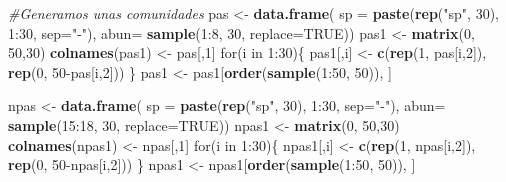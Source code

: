 \documentclass[]{book}
\newenvironment{Shaded}{\begin{snugshade}}{\end{snugshade}}
\newcommand{\KeywordTok}[1]{\textcolor[rgb]{0.13,0.29,0.53}{\textbf{{#1}}}}
\newcommand{\DataTypeTok}[1]{\textcolor[rgb]{0.13,0.29,0.53}{{#1}}}
\newcommand{\DecValTok}[1]{\textcolor[rgb]{0.00,0.00,0.81}{{#1}}}
\newcommand{\StringTok}[1]{\textcolor[rgb]{0.31,0.60,0.02}{{#1}}}
\newcommand{\CommentTok}[1]{\textcolor[rgb]{0.56,0.35,0.01}{\textit{{#1}}}}
\newcommand{\OtherTok}[1]{\textcolor[rgb]{0.56,0.35,0.01}{{#1}}}
\newcommand{\NormalTok}[1]{{#1}}
\begin{document}
\begin{Shaded}
\begin{Highlighting}[]
\CommentTok{#Generamos unas comunidades}
\NormalTok{pas <-}\StringTok{ }\KeywordTok{data.frame}\NormalTok{( }\DataTypeTok{sp =} \KeywordTok{paste}\NormalTok{(}\KeywordTok{rep}\NormalTok{(}\StringTok{"sp"}\NormalTok{, }\DecValTok{30}\NormalTok{), }\DecValTok{1}\NormalTok{:}\DecValTok{30}\NormalTok{, }\DataTypeTok{sep=}\StringTok{"-"}\NormalTok{), }
                   \DataTypeTok{abun=} \KeywordTok{sample}\NormalTok{(}\DecValTok{1}\NormalTok{:}\DecValTok{8}\NormalTok{, }\DecValTok{30}\NormalTok{, }\DataTypeTok{replace=}\OtherTok{TRUE}\NormalTok{))}
\NormalTok{pas1 <-}\StringTok{ }\KeywordTok{matrix}\NormalTok{(}\DecValTok{0}\NormalTok{, }\DecValTok{50}\NormalTok{,}\DecValTok{30}\NormalTok{)}
\KeywordTok{colnames}\NormalTok{(pas1) <-}\StringTok{ }\NormalTok{pas[,}\DecValTok{1}\NormalTok{]}
\NormalTok{for(i in }\DecValTok{1}\NormalTok{:}\DecValTok{30}\NormalTok{)\{}
\NormalTok{pas1[,i] <-}\StringTok{ }\KeywordTok{c}\NormalTok{(}\KeywordTok{rep}\NormalTok{(}\DecValTok{1}\NormalTok{, pas[i,}\DecValTok{2}\NormalTok{]), }\KeywordTok{rep}\NormalTok{(}\DecValTok{0}\NormalTok{, }\DecValTok{50}\NormalTok{-pas[i,}\DecValTok{2}\NormalTok{]))}
\NormalTok{\}}
\NormalTok{pas1 <-}\StringTok{ }\NormalTok{pas1[}\KeywordTok{order}\NormalTok{(}\KeywordTok{sample}\NormalTok{(}\DecValTok{1}\NormalTok{:}\DecValTok{50}\NormalTok{, }\DecValTok{50}\NormalTok{)), ]}

\NormalTok{npas <-}\StringTok{ }\KeywordTok{data.frame}\NormalTok{( }\DataTypeTok{sp =} \KeywordTok{paste}\NormalTok{(}\KeywordTok{rep}\NormalTok{(}\StringTok{"sp"}\NormalTok{, }\DecValTok{30}\NormalTok{), }\DecValTok{1}\NormalTok{:}\DecValTok{30}\NormalTok{, }\DataTypeTok{sep=}\StringTok{"-"}\NormalTok{), }
                    \DataTypeTok{abun=} \KeywordTok{sample}\NormalTok{(}\DecValTok{15}\NormalTok{:}\DecValTok{18}\NormalTok{, }\DecValTok{30}\NormalTok{, }\DataTypeTok{replace=}\OtherTok{TRUE}\NormalTok{))}
\NormalTok{npas1 <-}\StringTok{ }\KeywordTok{matrix}\NormalTok{(}\DecValTok{0}\NormalTok{, }\DecValTok{50}\NormalTok{,}\DecValTok{30}\NormalTok{)}
\KeywordTok{colnames}\NormalTok{(npas1) <-}\StringTok{ }\NormalTok{npas[,}\DecValTok{1}\NormalTok{]}
\NormalTok{for(i in }\DecValTok{1}\NormalTok{:}\DecValTok{30}\NormalTok{)\{}
\NormalTok{npas1[,i] <-}\StringTok{ }\KeywordTok{c}\NormalTok{(}\KeywordTok{rep}\NormalTok{(}\DecValTok{1}\NormalTok{, npas[i,}\DecValTok{2}\NormalTok{]), }\KeywordTok{rep}\NormalTok{(}\DecValTok{0}\NormalTok{, }\DecValTok{50}\NormalTok{-npas[i,}\DecValTok{2}\NormalTok{]))}
\NormalTok{\}}
\NormalTok{npas1 <-}\StringTok{ }\NormalTok{npas1[}\KeywordTok{order}\NormalTok{(}\KeywordTok{sample}\NormalTok{(}\DecValTok{1}\NormalTok{:}\DecValTok{50}\NormalTok{, }\DecValTok{50}\NormalTok{)), ]}


\end{Highlighting}
\end{Shaded}
\end{document}
